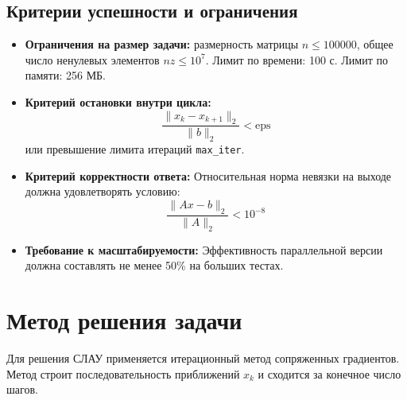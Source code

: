 \documentclass[12pt, a4paper]{article}
\begin{document}
\subsection{Критерии успешности и ограничения}
\begin{itemize}
    \item \textbf{Ограничения на размер задачи:} размерность матрицы $n \le 100000$, общее число ненулевых элементов $nz \le 10^7$. Лимит по времени: 100 с. Лимит по памяти: 256 МБ.
    \item \textbf{Критерий остановки внутри цикла:} 
    \begin{equation}
        \frac{\|x_k - x_{k+1}\|_2}{\|b\|_2} < \text{eps}
    \end{equation}
    или превышение лимита итераций \texttt{max\_iter}.
    \item \textbf{Критерий корректности ответа:} Относительная норма невязки на выходе должна удовлетворять условию:
    \begin{equation}
        \frac{\|Ax - b\|_2}{\|A\|_2} < 10^{-8}
    \end{equation}
    \item \textbf{Требование к масштабируемости:} Эффективность параллельной версии должна составлять не менее 50\% на больших тестах.
\end{itemize}

\pagebreak
\section{Метод решения задачи}
Для решения СЛАУ применяется итерационный метод сопряженных градиентов. Метод строит последовательность приближений $x_k$ и сходится за конечное число шагов.
\end{document}
